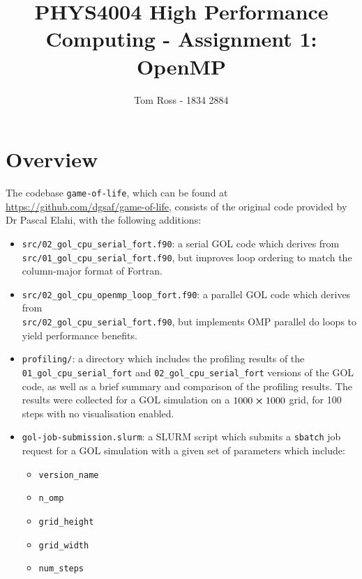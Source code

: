 \documentclass[]{article}
\title{PHYS4004 High Performance Computing - Assignment 1: OpenMP}
\author{Tom Ross - 1834 2884}
\date{}
\begin{document}
\tableofcontents

\newpage
\section{Overview}
\label{sec:Overview}

The codebase \lstinline[style=ff]{game-of-life}, which can be found at
\url{https://github.com/dgsaf/game-of-life}, consists of the original code
provided by Dr Pascal Elahi, with the following additions:
\begin{itemize}
\item \lstinline[style=ff]{src/02_gol_cpu_serial_fort.f90}: a serial GOL code
  which derives from \\ \lstinline[style=ff]{src/01_gol_cpu_serial_fort.f90},
  but improves loop ordering to match the column-major format of Fortran.

\item \lstinline[style=ff]{src/02_gol_cpu_openmp_loop_fort.f90}: a parallel GOL
  code which derives from \\
  \lstinline[style=ff]{src/02_gol_cpu_serial_fort.f90}, but implements OMP
  parallel do loops to yield performance benefits.

\item \lstinline[style=ff]{profiling/}: a directory which includes the profiling
  results of the \\ \lstinline[style=ff]{01_gol_cpu_serial_fort} and
  \lstinline[style=ff]{02_gol_cpu_serial_fort} versions of the GOL code, as well
  as a brief summary and comparison of the profiling results.
  The results were collected for a GOL simulation on a $1000\cross1000$ grid,
  for 100 steps with no visualisation enabled.

\item \lstinline[style=ff]{gol-job-submission.slurm}: a SLURM script which
  submits a \lstinline[style=ff]{sbatch} job request for a GOL simulation with a
  given set of parameters which include:
  \begin{itemize}
  \item \lstinline{version_name}

  \item \lstinline{n_omp}

  \item \lstinline{grid_height}

  \item \lstinline{grid_width}

  \item \lstinline{num_steps}


\end{itemize}
\end{itemize}
\end{document}
